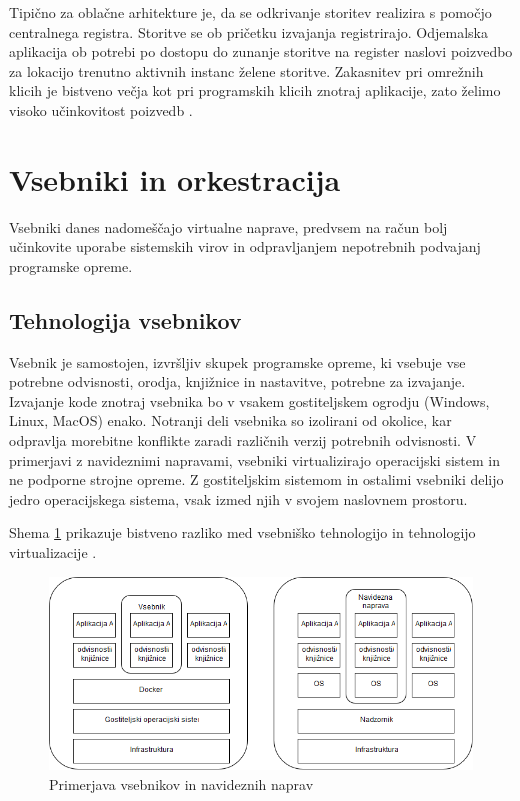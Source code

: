 \documentclass[a4paper, 12pt]{book}
\begin{document}
Tipično za oblačne arhitekture je, da se odkrivanje storitev realizira s pomočjo centralnega registra.
Storitve se ob pričetku izvajanja registrirajo.
Odjemalska aplikacija ob potrebi po dostopu do zunanje storitve na register naslovi poizvedbo za lokacijo trenutno aktivnih instanc želene storitve.
Zakasnitev pri omrežnih klicih je bistveno večja kot pri programskih klicih znotraj aplikacije, zato želimo visoko učinkovitost poizvedb \cite{serviceDiscovery, maldip}.

\section{Vsebniki in orkestracija}

Vsebniki danes nadomeščajo virtualne naprave, predvsem na račun bolj učinkovite uporabe sistemskih virov in odpravljanjem nepotrebnih podvajanj programske opreme.

\subsection{Tehnologija vsebnikov}
Vsebnik je samostojen, izvršljiv skupek programske opreme, ki vsebuje vse potrebne odvisnosti, orodja, knjižnice in nastavitve, potrebne za izvajanje.
Izvajanje kode znotraj vsebnika bo v vsakem gostiteljskem ogrodju (Windows, Linux, MacOS) enako.
Notranji deli vsebnika so izolirani od okolice, kar odpravlja morebitne konflikte zaradi različnih verzij potrebnih odvisnosti.
V primerjavi z navideznimi napravami, vsebniki virtualizirajo operacijski sistem in ne podporne strojne opreme.
Z gostiteljskim sistemom in ostalimi vsebniki delijo jedro operacijskega sistema, vsak izmed njih v svojem naslovnem prostoru.

Shema \ref{vm_vs_container} prikazuje bistveno razliko med vsebniško tehnologijo in tehnologijo virtualizacije \cite{dockerContainer}.

\begin{figure}[h]
	\includegraphics[width=1.0\textwidth]{slike/vsebniki_vm.png}
	\caption{Primerjava vsebnikov in navideznih naprav}
	\label{vm_vs_container}
\end{figure}
\end{document}
